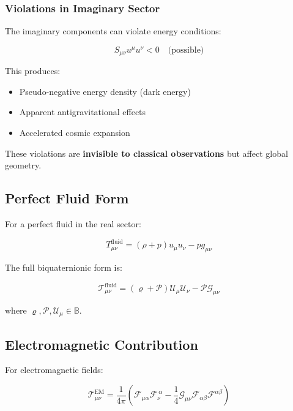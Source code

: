 \subsubsection{Violations in Imaginary Sector}

The imaginary components can violate energy conditions:

\begin{equation}
S_{\mu\nu} u^\mu u^\nu < 0 \quad \text{(possible)}
\end{equation}

This produces:
\begin{itemize}
    \item Pseudo-negative energy density (dark energy)
    \item Apparent antigravitational effects
    \item Accelerated cosmic expansion
\end{itemize}

These violations are \textbf{invisible to classical observations} but affect global geometry.

\subsection{Perfect Fluid Form}

For a perfect fluid in the real sector:

\begin{equation}
T_{\mu\nu}^{\text{fluid}} = (\rho + p) u_\mu u_\nu - p g_{\mu\nu}
\end{equation}

The full biquaternionic form is:

\begin{equation}
\mathcal{T}_{\mu\nu}^{\text{fluid}} = (\varrho + \mathcal{P}) \mathcal{U}_\mu \mathcal{U}_\nu - \mathcal{P} \mathcal{G}_{\mu\nu}
\end{equation}

where $\varrho, \mathcal{P}, \mathcal{U}_\mu \in \mathbb{B}$.

\subsection{Electromagnetic Contribution}

For electromagnetic fields:

\begin{equation}
\mathcal{T}_{\mu\nu}^{\text{EM}} = \frac{1}{4\pi}\left(\mathcal{F}_{\mu\alpha}\mathcal{F}_\nu^{\ \alpha} - \frac{1}{4}\mathcal{G}_{\mu\nu}\mathcal{F}_{\alpha\beta}\mathcal{F}^{\alpha\beta}\right)
\end{equation}

